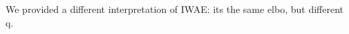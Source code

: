 \documentclass{article} %
\begin{document}

We provided a different interpretation of IWAE: its the same elbo, but different q. 



 



\newpage















\end{document}
